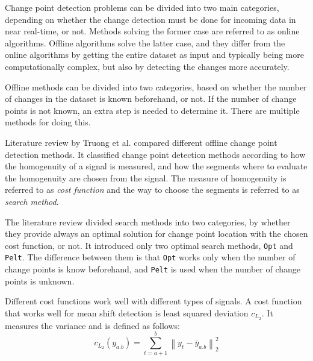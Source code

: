 Change point detection problems can be divided into two main categories, depending on whether the change detection must be done for incoming data in near real-time, or not. Methods solving the former case are referred to as online algorithms. Offline algorithms solve the latter case, and they differ from the online algorithms by getting the entire dataset as input and typically being more computationally complex, but also by detecting the changes more accurately.

Offline methods can be divided into two categories, based on whether the number of changes in the dataset is known beforehand, or not. If the number of change points is not known, an extra step is needed to determine it. There are multiple methods for doing this.

Literature review by Truong et al. \cite{truongSelectiveReviewOffline2020} compared different offline change point detection methods. It classified change point detection methods according to how the homogenuity of a signal is measured, and how the segments where to evaluate the homogenuity are chosen from the signal. The measure of homogenuity is referred to as \textit{cost function} and the way to choose the segments is referred to as \textit{search method}.

The literature review divided search methods into two categories, by whether they provide always an optimal solution for change point location with the chosen cost function, or not. It introduced only two optimal search methods, \texttt{Opt} and \texttt{Pelt}. The difference between them is that \texttt{Opt} works only when the number of change points is know beforehand, and \texttt{Pelt} is used when the number of change points is unknown. 

Different cost functions work well with different types of signals. 
A cost function that works well for mean shift detection is least squared deviation $c_{L_2}$. It measures the variance and is defined as follows:
\begin{equation}
    c_{L_2}(y_{a.b}) = \sum^b_{t=a+1} \left\lVert y_t-\overline{y}_{a.b} \right\rVert ^2_2%
    \label{eq:l2}
\end{equation}

